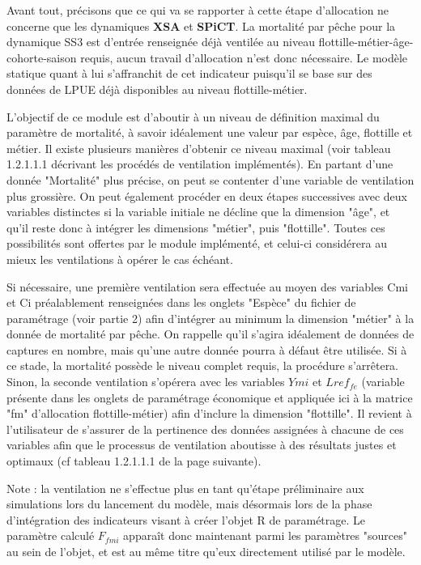 \documentclass[12pt, colorinlistoftodos]{article}
\begin{document}
Avant tout, précisons que ce qui va se rapporter à cette étape d'allocation ne concerne que les dynamiques \textbf{XSA} et \textbf{SPiCT}. 
La mortalité par pêche pour la dynamique SS3 est d'entrée renseignée déjà ventilée au niveau flottille-métier-âge-cohorte-saison 
requis, aucun travail d'allocation n'est donc nécessaire. Le modèle statique quant à lui s'affranchit de cet indicateur
 puisqu'il se base sur des données de LPUE déjà disponibles au niveau flottille-métier. 

L’objectif de ce module est d’aboutir à un niveau de définition maximal du paramètre de mortalité, à savoir idéalement 
une valeur par espèce, âge, flottille et métier. Il existe plusieurs manières d’obtenir ce niveau maximal  
(voir tableau 1.2.1.1.1 décrivant les procédés de ventilation implémentés). En partant d’une donnée "Mortalité" plus précise, 
on peut se contenter d’une variable de ventilation plus grossière. On peut également procéder en deux étapes successives 
avec deux variables distinctes si la variable initiale ne décline que la dimension "âge", et qu'il reste donc à 
intégrer les dimensions "métier", puis "flottille". Toutes ces possibilités sont offertes par le module implémenté, 
et celui-ci considérera au mieux les ventilations à opérer le cas échéant.

Si nécessaire, une première ventilation sera effectuée au moyen des variables Cmi et Ci préalablement renseignées dans 
les onglets "Espèce" du fichier de paramétrage (voir partie 2) afin d'intégrer au minimum la dimension "métier" à 
la donnée de mortalité par pêche. On rappelle qu'il s'agira idéalement de données de captures en nombre, mais qu'une 
autre donnée pourra à défaut être utilisée. Si à ce stade, la mortalité possède le niveau complet requis, la procédure s'arrêtera. 
Sinon, la seconde ventilation s’opérera avec les variables $Ymi$ et $Lref_{fe}$ (variable présente dans les onglets de 
paramétrage économique et appliquée ici à la matrice "fm" d'allocation flottille-métier) afin d'inclure la dimension 
"flottille". Il revient à l'utilisateur de s'assurer de la pertinence des données assignées à chacune de 
ces variables afin que le processus de ventilation aboutisse à des résultats justes et optimaux 
(cf tableau 1.2.1.1.1 de la page suivante).   

Note : la ventilation ne s'effectue plus en tant qu'étape préliminaire aux simulations lors du lancement du modèle, 
mais désormais  lors de la phase d'intégration des indicateurs visant à créer l'objet R de paramétrage. Le paramètre calculé 
$F_{fmi}$ apparaît donc maintenant parmi les paramètres "sources" au sein de l'objet, et est au même titre qu'eux 
directement utilisé par le modèle.  
\end{document}
